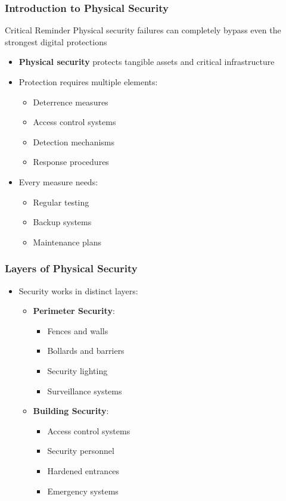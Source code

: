 \documentclass{beamer}
\begin{document}
\begin{frame}
    \frametitle{Introduction to Physical Security}
    \begin{alertblock}{Critical Reminder}
        Physical security failures can completely bypass even the strongest digital protections
    \end{alertblock}
    \begin{itemize}
        \item \textbf{Physical security} protects tangible assets and critical infrastructure
        \item Protection requires multiple elements:
          \begin{itemize}
            \item Deterrence measures
            \item Access control systems
            \item Detection mechanisms
            \item Response procedures
          \end{itemize}
        \item Every measure needs:
          \begin{itemize}
            \item Regular testing
            \item Backup systems
            \item Maintenance plans
          \end{itemize}
    \end{itemize}
\end{frame}

\begin{frame}
    \frametitle{Layers of Physical Security}
    \begin{itemize}
        \item Security works in distinct layers:
          \begin{itemize}
            \item \textbf{Perimeter Security}:
              \begin{itemize}
                \item Fences and walls
                \item Bollards and barriers
                \item Security lighting
                \item Surveillance systems
              \end{itemize}
            \item \textbf{Building Security}:
              \begin{itemize}
                \item Access control systems
                \item Security personnel
                \item Hardened entrances
                \item Emergency systems
              \end{itemize}
          \end{itemize}
    \end{itemize}
\end{frame}
\end{document}

